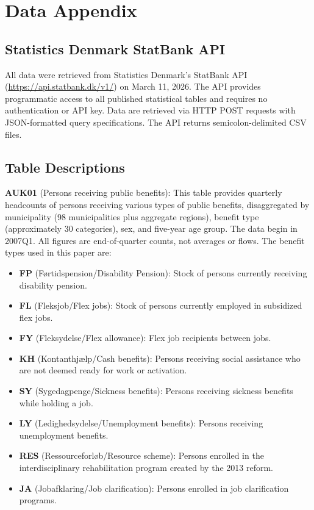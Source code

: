 \documentclass[12pt]{article}
\begin{document}
\section{Data Appendix}
\label{sec:app_data}

\subsection{Statistics Denmark StatBank API}

All data were retrieved from Statistics Denmark's StatBank API (\url{https://api.statbank.dk/v1/}) on March 11, 2026. The API provides programmatic access to all published statistical tables and requires no authentication or API key. Data are retrieved via HTTP POST requests with JSON-formatted query specifications. The API returns semicolon-delimited CSV files.

\subsection{Table Descriptions}

\textbf{AUK01} (Persons receiving public benefits): This table provides quarterly headcounts of persons receiving various types of public benefits, disaggregated by municipality (98 municipalities plus aggregate regions), benefit type (approximately 30 categories), sex, and five-year age group. The data begin in 2007Q1. All figures are end-of-quarter counts, not averages or flows. The benefit types used in this paper are:
\begin{itemize}
\item \textbf{FP} (F\o{}rtidspension/Disability Pension): Stock of persons currently receiving disability pension.
\item \textbf{FL} (Fleksjob/Flex jobs): Stock of persons currently employed in subsidized flex jobs.
\item \textbf{FY} (Fleksydelse/Flex allowance): Flex job recipients between jobs.
\item \textbf{KH} (Kontanthj\ae{}lp/Cash benefits): Persons receiving social assistance who are not deemed ready for work or activation.
\item \textbf{SY} (Sygedagpenge/Sickness benefits): Persons receiving sickness benefits while holding a job.
\item \textbf{LY} (Ledighedsydelse/Unemployment benefits): Persons receiving unemployment benefits.
\item \textbf{RES} (Ressourceforl\o{}b/Resource scheme): Persons enrolled in the interdisciplinary rehabilitation program created by the 2013 reform.
\item \textbf{JA} (Jobafklaring/Job clarification): Persons enrolled in job clarification programs.
\end{itemize}
\end{document}

